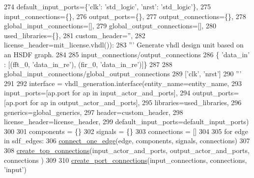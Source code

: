 \begin{DoxyCode}
274                  default\_input\_ports=\{\textcolor{stringliteral}{'clk'}: \textcolor{stringliteral}{'std\_logic'}, \textcolor{stringliteral}{'nrst'}: \textcolor{stringliteral}{'std\_logic'}\},
275                  input\_connections=\{\},
276                  output\_ports=\{\},
277                  output\_connections=\{\},
278                  global\_input\_connections=[],
279                  global\_output\_connections=[],
280                  used\_libraries=\{\},
281                  custom\_header=\textcolor{stringliteral}{''},
282                  license\_header=mit\_license.vhdl()):
283     \textcolor{stringliteral}{''' Generate vhdl design unit based on an HSDF graph.}
284 \textcolor{stringliteral}{}
285 \textcolor{stringliteral}{      input\_connections/output\_connections}
286 \textcolor{stringliteral}{        \{ 'data\_in' : [(fft\_0, 'data\_in\_re'), (fir\_0, 'data\_in\_re')]\}}
287 \textcolor{stringliteral}{}
288 \textcolor{stringliteral}{      global\_input\_connections/global\_output\_connections}
289 \textcolor{stringliteral}{        ['clk', 'nrst']}
290 \textcolor{stringliteral}{    '''}
291 
292     interface = vhdl\_generation.interface(entity\_name=entity\_name,
293                                           input\_ports=[ap.port \textcolor{keywordflow}{for} ap \textcolor{keywordflow}{in} input\_actor\_and\_ports],
294                                           output\_ports=[ap.port \textcolor{keywordflow}{for} ap \textcolor{keywordflow}{in} output\_actor\_and\_ports],
295                                           libraries=used\_libraries,
296                                           generics=global\_generics,
297                                           header=custom\_header,
298                                           license\_header=license\_header,
299                                           default\_input\_ports=default\_input\_ports)
300 
301     components = \{\}
302     signals = \{\}
303     connections = []
304 
305     \textcolor{keywordflow}{for} edge \textcolor{keywordflow}{in} sdf\_edges:
306         \hyperlink{namespacesylva_1_1code__generation_1_1hsdf__to__vhdl_a5976ee6a55f22e1fc1e9fc87bac3ea62}{connect\_one\_edge}(edge, components, signals, connections)
307 
308     \hyperlink{namespacesylva_1_1code__generation_1_1hsdf__to__vhdl_a09020e1a1ea5a2d3e4b8cdd35f51a185}{create\_top\_connections}(input\_actor\_and\_ports, output\_actor\_and\_ports, connections
      )
309 
310     \hyperlink{namespacesylva_1_1code__generation_1_1hsdf__to__vhdl_a32b4f40eadeb985a68674b401be7a1dc}{create\_port\_connections}(input\_connections, connections, \textcolor{stringliteral}{'input'})

\end{DoxyCode}
